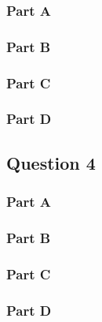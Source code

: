\subsubsection{Part A}
\subsubsection{Part B}
\subsubsection{Part C}
\subsubsection{Part D}

\newpage
\subsection{Question 4}
\subsubsection{Part A}
\subsubsection{Part B}
\subsubsection{Part C}
\subsubsection{Part D}

%

